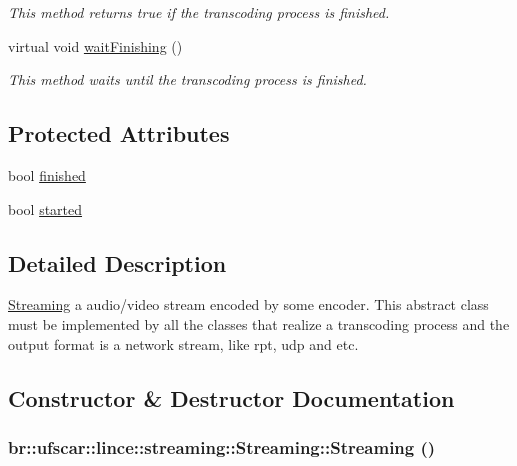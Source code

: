 \begin{DoxyCompactItemize}
\begin{DoxyCompactList}\small\item\em This method returns true if the transcoding process is finished. \item\end{DoxyCompactList}\item 
virtual void \hyperlink{classbr_1_1ufscar_1_1lince_1_1streaming_1_1Streaming_abe9c0683b3b97fe5c924907ce4c7b803}{waitFinishing} ()
\begin{DoxyCompactList}\small\item\em This method waits until the transcoding process is finished. \item\end{DoxyCompactList}\end{DoxyCompactItemize}
\subsection*{Protected Attributes}
\begin{DoxyCompactItemize}
\item 
bool \hyperlink{classbr_1_1ufscar_1_1lince_1_1streaming_1_1Streaming_abe03b3af08b39a8389c4c70bc17e4663}{finished}
\item 
bool \hyperlink{classbr_1_1ufscar_1_1lince_1_1streaming_1_1Streaming_a64e2c8f53657a4572993d665acfcf6f6}{started}
\end{DoxyCompactItemize}


\subsection{Detailed Description}
\hyperlink{classbr_1_1ufscar_1_1lince_1_1streaming_1_1Streaming}{Streaming} a audio/video stream encoded by some encoder. This abstract class must be implemented by all the classes that realize a transcoding process and the output format is a network stream, like rpt, udp and etc. 

\subsection{Constructor \& Destructor Documentation}
\hypertarget{classbr_1_1ufscar_1_1lince_1_1streaming_1_1Streaming_a91b9b728a05fdb56d4f86b7a1c9aceee}{
\subsubsection[{Streaming}]{\setlength{\rightskip}{0pt plus 5cm}br::ufscar::lince::streaming::Streaming::Streaming ()}}
\label{classbr_1_1ufscar_1_1lince_1_1streaming_1_1Streaming_a91b9b728a05fdb56d4f86b7a1c9aceee}


